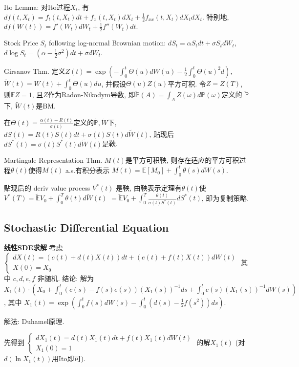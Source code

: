 \documentclass[UTF8]{ctexart}
\begin{document}
Ito Lemma: 对Ito过程$X_t$, 有
$df(t,X_t) = f_t(t,X_t)dt + f_x(t,X_t)dX_t+\frac{1}{2}f_{xx}(t,X_t)dX_tdX_t$.
特别地, $df(W(t)) = f'(W_t)dW_t + \frac{1}{2}f''(W_t)dt$.

Stock Price $S_t$ following log-normal Brownian motion:
$dS_t = \alpha S_t dt + \sigma S_t dW_t$,
$d \log S_t = (\alpha -\frac{1}{2}\sigma^2)dt+\sigma dW_t$.

Girsanov Thm.
定义$Z(t)=\exp\left(-\int_0^t \Theta(u)dW(u)-\frac12 \int_0^t \Theta(u)^2 d\right)$,
$\widetilde{W}(t)=W(t)+\int_0^t\Theta(u)du$,
并假设$\Theta(u)Z(u)$平方可积.
令$Z=Z(T)$, 则$\mathbb{E}Z=1$,
且$Z$作为Radon-Nikodym导数, 即$\widetilde{\mathbb{P}}(A)=\int_A Z(\omega)d\mathbb{P}(\omega)$定义的
$\widetilde{\mathbb{P}}$下, $\widetilde{W}(t)$是BM.

在$\Theta(t)=\frac{\alpha(t)-R(t)}{\sigma(t)}$定义的$\widetilde{\mathbb{P}},\widetilde{W}$下,
$dS(t)=R(t)S(t)dt+\sigma(t)S(t)d\widetilde{W}(t)$, 贴现后
$dS^*(t)=\sigma(t) S^*(t) d\widetilde{W}(t)$是鞅.

Martingale Representation Thm.
$M(t)$是平方可积鞅, 则存在适应的平方可积过程$\theta(t)$使得$M(t)$ a.s.有积分表示
$M(t)=\mathbb{E}[M_0]+\int_0^t \theta(s) dW(s)$.

贴现后的 deriv value process $V^*(t)$ 是鞅, 由鞅表示定理有$\theta(t)$使
$V^*(T)=\widetilde{\mathbb{E}}V_0 + \int_0^T \theta(t) d\widetilde{W}(t)$
$=\widetilde{\mathbb{E}}V_0 + \int_0^T \frac{\theta(t)}{\sigma(t)S^*(t)} dS^*(t)$,
即为复制策略.

\subsection{Stochastic Differential Equation}

\textbf{线性SDE求解}  考虑$\left\{\begin{array}{l}
		d X(t)=(c(t)+d(t) X(t)) d t+(e(t)+f(t) X(t)) d W(t) \\
		X(0)=X_0\end{array}\right. $
其中 $c,d,e,f$ 非随机.
结论: 解为 $X_1(t) \cdot\left(X_0+\int_0^t(c(s)-f(s) e(s))\left(X_1(s)\right)^{-1} d s
	+\int_0^t e(s) \left(X_1(s)\right)^{-1} d W(s)\right)$,
其中 $X_1(t)=\exp \left(\int_0^t f(s) d W(s)-\int_0^t (d(s)-\frac{1}{2} f(s^2)) d s\right)$.

解法: Duhamel原理.

先得到 $\left\{\begin{array}{l}d X_1(t)=d(t) X_1(t) d t+f(t) X_1(t) d W(t) \\ X_1(0)=1\end{array}\right.$
的解$X_1(t)$ (对$d\left(\ln X_1(t)\right)$用Ito即可).
\end{document}
